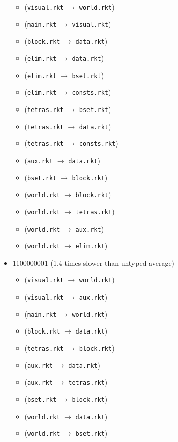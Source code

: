 \documentclass{article}
\newcommand{\mono}[1]{\texttt{#1}}
\begin{document}
\begin{itemize}
\begin{itemize}
  \item (\mono{visual.rkt} $\rightarrow$ \mono{world.rkt})
  \item (\mono{main.rkt} $\rightarrow$ \mono{visual.rkt})
  \item (\mono{block.rkt} $\rightarrow$ \mono{data.rkt})
  \item (\mono{elim.rkt} $\rightarrow$ \mono{data.rkt})
  \item (\mono{elim.rkt} $\rightarrow$ \mono{bset.rkt})
  \item (\mono{elim.rkt} $\rightarrow$ \mono{consts.rkt})
  \item (\mono{tetras.rkt} $\rightarrow$ \mono{bset.rkt})
  \item (\mono{tetras.rkt} $\rightarrow$ \mono{data.rkt})
  \item (\mono{tetras.rkt} $\rightarrow$ \mono{consts.rkt})
  \item (\mono{aux.rkt} $\rightarrow$ \mono{data.rkt})
  \item (\mono{bset.rkt} $\rightarrow$ \mono{block.rkt})
  \item (\mono{world.rkt} $\rightarrow$ \mono{block.rkt})
  \item (\mono{world.rkt} $\rightarrow$ \mono{tetras.rkt})
  \item (\mono{world.rkt} $\rightarrow$ \mono{aux.rkt})
  \item (\mono{world.rkt} $\rightarrow$ \mono{elim.rkt})
  \end{itemize}
\item 1100000001 (1.4 times slower than untyped average)
  \begin{itemize}
  \item (\mono{visual.rkt} $\rightarrow$ \mono{world.rkt})
  \item (\mono{visual.rkt} $\rightarrow$ \mono{aux.rkt})
  \item (\mono{main.rkt} $\rightarrow$ \mono{world.rkt})
  \item (\mono{block.rkt} $\rightarrow$ \mono{data.rkt})
  \item (\mono{tetras.rkt} $\rightarrow$ \mono{block.rkt})
  \item (\mono{aux.rkt} $\rightarrow$ \mono{data.rkt})
  \item (\mono{aux.rkt} $\rightarrow$ \mono{tetras.rkt})
  \item (\mono{bset.rkt} $\rightarrow$ \mono{block.rkt})
  \item (\mono{world.rkt} $\rightarrow$ \mono{data.rkt})
  \item (\mono{world.rkt} $\rightarrow$ \mono{bset.rkt})

\end{itemize}
\end{itemize}
\end{document}
